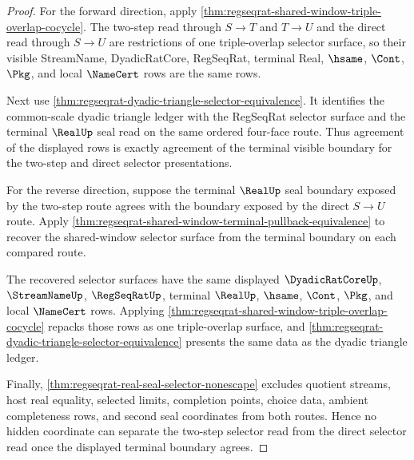 \begin{proof}
For the forward direction, apply \autoref{thm:regseqrat-shared-window-triple-overlap-cocycle}. The two-step read through $S \to T$ and $T \to U$ and the direct read through $S \to U$ are restrictions of one triple-overlap selector surface, so their visible StreamName, DyadicRatCore, RegSeqRat, terminal Real, $\hsame$, $\Cont$, $\Pkg$, and local $\NameCert$ rows are the same rows.

Next use \autoref{thm:regseqrat-dyadic-triangle-selector-equivalence}. It identifies the common-scale dyadic triangle ledger with the RegSeqRat selector surface and the terminal $\RealUp$ seal read on the same ordered four-face route. Thus agreement of the displayed rows is exactly agreement of the terminal visible boundary for the two-step and direct selector presentations.

For the reverse direction, suppose the terminal $\RealUp$ seal boundary exposed by the two-step route agrees with the boundary exposed by the direct $S \to U$ route. Apply \autoref{thm:regseqrat-shared-window-terminal-pullback-equivalence} to recover the shared-window selector surface from the terminal boundary on each compared route.

The recovered selector surfaces have the same displayed $\DyadicRatCoreUp$, $\StreamNameUp$, $\RegSeqRatUp$, terminal $\RealUp$, $\hsame$, $\Cont$, $\Pkg$, and local $\NameCert$ rows. Applying \autoref{thm:regseqrat-shared-window-triple-overlap-cocycle} repacks those rows as one triple-overlap surface, and \autoref{thm:regseqrat-dyadic-triangle-selector-equivalence} presents the same data as the dyadic triangle ledger.

Finally, \autoref{thm:regseqrat-real-seal-selector-nonescape} excludes quotient streams, host real equality, selected limits, completion points, choice data, ambient completeness rows, and second seal coordinates from both routes. Hence no hidden coordinate can separate the two-step selector read from the direct selector read once the displayed terminal boundary agrees.
\end{proof}

